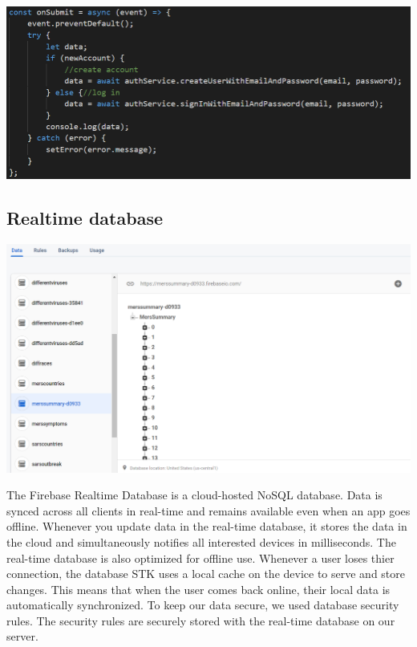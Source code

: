 \begin{center}    
      \includegraphics[scale=0.55]{img/login.PNG}
\end{center}

\subsection{Realtime database}

\begin{center}    
      \includegraphics[scale=0.4]{img/Firebasedb.PNG}
\end{center}

The Firebase Realtime Database is a cloud-hosted NoSQL database.
Data is synced across all clients in real-time and remains available even when an app goes offline.
Whenever you update data in the real-time database, it stores the data in the cloud and simultaneously notifies all interested devices in milliseconds. The real-time database is also optimized for offline use. 
Whenever a user loses thier connection, the database STK uses a local cache on the device to serve and store changes. This means that when the user comes back online, their local data is automatically synchronized. To keep our data secure, we used database security rules.
The security rules are securely stored with the real-time database on our server.


